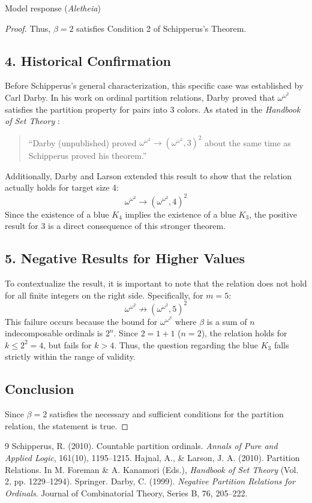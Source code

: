 \documentclass[11pt]{article}
\begin{document}
\begin{solution}{Model response (\emph{Aletheia})}
\begin{proof}
Thus, $\beta = 2$ satisfies Condition 2 of Schipperus's Theorem.

\subsection*{4. Historical Confirmation}
Before Schipperus's general characterization, this specific case was established by Carl Darby. In his work on ordinal partition relations, Darby proved that $\omega^{\omega^2}$ satisfies the partition property for pairs into 3 colors. As stated in the \textit{Handbook of Set Theory} \cite{hajnal2010}:
\begin{quote}
    ``Darby (unpublished) proved $\omega^{\omega^2} \to (\omega^{\omega^2}, 3)^2$ about the same time as Schipperus proved his theorem.''
\end{quote}
Additionally, Darby and Larson extended this result to show that the relation actually holds for target size 4:
\[ \omega^{\omega^2} \to (\omega^{\omega^2}, 4)^2 \]
Since the existence of a blue $K_4$ implies the existence of a blue $K_3$, the positive result for 3 is a direct consequence of this stronger theorem.

\subsection*{5. Negative Results for Higher Values}
To contextualize the result, it is important to note that the relation does not hold for all finite integers on the right side. Specifically, for $m=5$:
\[ \omega^{\omega^2} \not\to (\omega^{\omega^2}, 5)^2 \]
This failure occurs because the bound for $\omega^{\omega^\beta}$ where $\beta$ is a sum of $n$ indecomposable ordinals is $2^n$. Since $2 = 1+1$ ($n=2$), the relation holds for $k \le 2^2 = 4$, but fails for $k > 4$. Thus, the question regarding the blue $K_3$ falls strictly within the range of validity.

\subsection*{Conclusion}
Since $\beta=2$ satisfies the necessary and sufficient conditions for the partition relation, the statement is true.
\end{proof}

\begin{thebibliography}{9}
 Schipperus, R. (2010). Countable partition ordinals. \textit{Annals of Pure and Applied Logic}, 161(10), 1195--1215.
 Hajnal, A., \& Larson, J. A. (2010). Partition Relations. In M. Foreman \& A. Kanamori (Eds.), \textit{Handbook of Set Theory} (Vol. 2, pp. 1229--1294). Springer.
 Darby, C. (1999). \textit{Negative Partition Relations for Ordinals}. Journal of Combinatorial Theory, Series B, 76, 205--222.
\end{thebibliography}
\end{solution}
\end{document}
